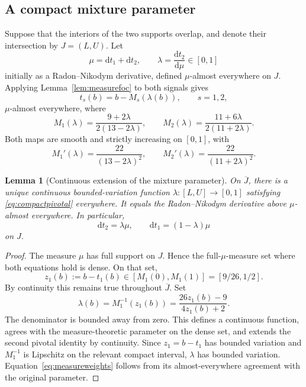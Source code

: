 \documentclass[11pt,a4paper]{article}
\numberwithin{equation}{section}
\newtheorem{lemma}[theorem]{Lemma}
\theoremstyle{definition}
\theoremstyle{remark}
\begin{document}
\subsection{A compact mixture parameter}
Suppose that the interiors of the two supports overlap, and denote their intersection by $J=(L,U)$. Let
\[
 \mu=\mathrm dt_1+\mathrm dt_2,\qquad
 \lambda=\frac{\mathrm dt_2}{\mathrm d\mu}\in[0,1]
\]
initially as a Radon--Nikodym derivative, defined $\mu$-almost everywhere on $J$. Applying Lemma~\ref{lem:measurefoc} to both signals gives
\begin{equation}
\label{eq:compactpivotal}
 t_s(b)=b-M_s(\lambda(b)),\qquad s=1,2,
\end{equation}
$\mu$-almost everywhere, where
\begin{equation}
\label{eq:Ms}
 M_1(\lambda)=\frac{9+2\lambda}{2(13-2\lambda)},
 \qquad
 M_2(\lambda)=\frac{11+6\lambda}{2(11+2\lambda)}.
\end{equation}
Both maps are smooth and strictly increasing on $[0,1]$, with
\begin{equation}
\label{eq:Msprime}
 M_1'(\lambda)=\frac{22}{(13-2\lambda)^2},
 \qquad
 M_2'(\lambda)=\frac{22}{(11+2\lambda)^2}.
\end{equation}

\begin{lemma}[Continuous extension of the mixture parameter]
\label{lem:extension}
On $\overline J$, there is a unique continuous bounded-variation function $\lambda:[L,U]\to[0,1]$ satisfying \eqref{eq:compactpivotal} everywhere. It equals the Radon--Nikodym derivative above $\mu$-almost everywhere. In particular,
\begin{equation}
\label{eq:measureweights}
 \mathrm dt_2=\lambda\mu,\qquad
 \mathrm dt_1=(1-\lambda)\mu
\end{equation}
on $J$.
\end{lemma}
\begin{proof}
The measure $\mu$ has full support on $J$. Hence the full-$\mu$-measure set where both equations hold is dense. On that set,
\[
 z_1(b):=b-t_1(b)\in[M_1(0),M_1(1)]=[9/26,1/2].
\]
By continuity this remains true throughout $\overline J$. Set
\begin{equation}
\label{eq:lambdaexplicit}
 \lambda(b)=M_1^{-1}(z_1(b))
 =\frac{26z_1(b)-9}{4z_1(b)+2}.
\end{equation}
The denominator is bounded away from zero. This defines a continuous function, agrees with the measure-theoretic parameter on the dense set, and extends the second pivotal identity by continuity. Since $z_1=b-t_1$ has bounded variation and $M_1^{-1}$ is Lipschitz on the relevant compact interval, $\lambda$ has bounded variation. Equation~\eqref{eq:measureweights} follows from its almost-everywhere agreement with the original parameter.
\end{proof}
\end{document}
